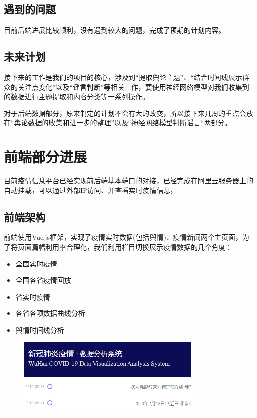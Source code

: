 \documentclass{article}
\begin{document}
\subsection{遇到的问题}
目前后端进展比较顺利，没有遇到较大的问题，完成了预期的计划内容。

\subsection{未来计划}
接下来的工作是我们的项目的核心，涉及到“提取舆论主题”、“结合时间线展示群众的关注点变化”以及“谣言判断”等相关工作，要使用神经网络模型对我们收集到的数据进行主题提取和内容分类等一系列操作。

对于后端数据部分，原来制定的计划不会有大的改变，所以接下来几周的重点会放在“舆论数据的收集和进一步的整理”以及“神经网络模型判断谣言“两部分。



\section{前端部分进展}
目前疫情信息平台已经实现前后端基本端口的对接，已经完成在阿里云服务器上的自动挂载，可以通过外部IP访问、并查看实时疫情信息。
\subsection{前端架构}
前端使用Vue.js框架，实现了疫情实时数据(包括舆情)、疫情新闻两个主页面，为了将页面篇幅利用率合理化，我们利用栏目切换展示疫情数据的几个角度：
\begin{itemize}
	\item 全国实时疫情
	\item 全国各省疫情回放
	\item 省实时疫情
	\item 各省各项数据曲线分析 
	\item 舆情时间线分析
\end{itemize}
\begin{figure}[htb]
\centering
\includegraphics[width=0.8\textwidth]{pic2.png}
\end{figure}
\end{document}

